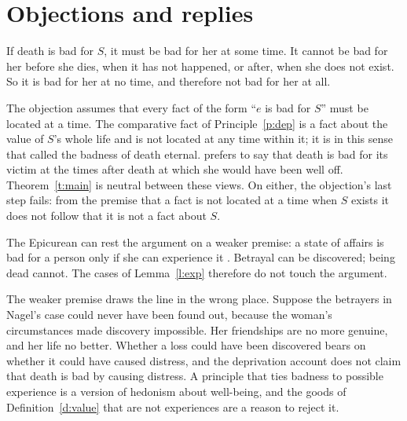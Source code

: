 \documentclass{situationist-preprint}
\begin{document}
\section{Objections and replies}\label{s:obj}

\begin{objection}[Timing]\label{o:time}
If death is bad for $S$, it must be bad for her at some time. It cannot be bad for her before she dies, when it has not happened, or after, when she does not exist. So it is bad for her at no time, and therefore not bad for her at all.
\end{objection}

\begin{reply}
The objection assumes that every fact of the form \enquote{$e$ is bad for $S$} must be located at a time. The comparative fact of Principle~\ref{p:dep} is a fact about the value of $S$'s whole life and is not located at any time within it; it is in this sense that \citet{Feldman1992} called the badness of death eternal. \citet{Bradley2009} prefers to say that death is bad for its victim at the times after death at which she would have been well off. Theorem~\ref{t:main} is neutral between these views. On either, the objection's last step fails: from the premise that a fact is not located at a time when $S$ exists it does not follow that it is not a fact about $S$.
\end{reply}

\begin{objection}[Rosenbaum]\label{o:rosen}
The Epicurean can rest the argument on a weaker premise: a state of affairs is bad for a person only if she can experience it \citep{Rosenbaum1986}. Betrayal can be discovered; being dead cannot. The cases of Lemma~\ref{l:exp} therefore do not touch the argument.
\end{objection}

\begin{reply}
The weaker premise draws the line in the wrong place. Suppose the betrayers in Nagel's case could never have been found out, because the woman's circumstances made discovery impossible. Her friendships are no more genuine, and her life no better. Whether a loss could have been discovered bears on whether it could have caused distress, and the deprivation account does not claim that death is bad by causing distress. A principle that ties badness to possible experience is a version of hedonism about well-being, and the goods of Definition~\ref{d:value} that are not experiences are a reason to reject it.
\end{reply}
\end{document}
